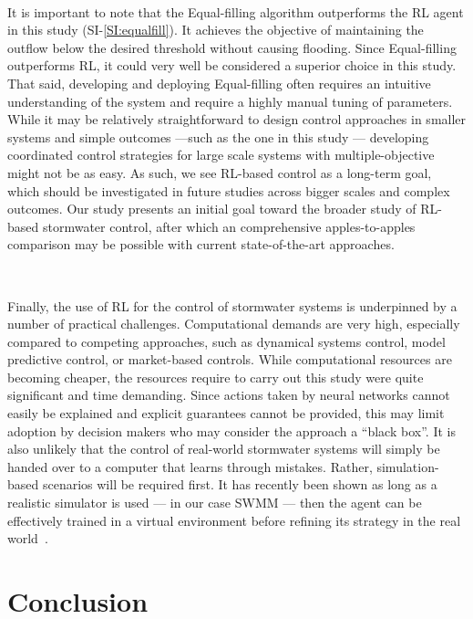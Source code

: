 \

It is important to note that the Equal-filling algorithm outperforms the RL agent in this study (SI-\ref{SI:equalfill}).
It achieves the objective of maintaining the outflow below the desired threshold without causing flooding.
Since Equal-filling outperforms RL, it could very well be considered a superior choice in this study.
That said, developing and deploying Equal-filling often requires an intuitive understanding of the system and require a highly manual tuning of parameters.
While it may be relatively straightforward to design control approaches in smaller systems and simple outcomes ---such as the one in this study --- developing coordinated control strategies for large scale systems with multiple-objective might not be as easy.
As such, we see RL-based control as a long-term goal, which should be investigated in future studies across bigger scales and complex outcomes.
Our study presents an initial goal toward the broader study of RL-based stormwater control, after which an comprehensive apples-to-apples comparison may be possible with current state-of-the-art approaches.

\

Finally, the use of RL for the control of stormwater systems is underpinned by a number of practical challenges.
Computational demands are very high, especially compared to competing approaches, such as dynamical systems control, model predictive control, or market-based controls.
While computational resources are becoming cheaper, the resources require to carry out this study were quite significant and time demanding.
Since actions taken by neural networks cannot easily be explained and explicit guarantees cannot be provided, this may limit adoption by decision makers who may consider the approach a “black box”.
It is also unlikely that the control of real-world stormwater systems will simply be handed over to a computer that learns through mistakes.
Rather, simulation-based scenarios will be required first.
It has recently been shown as long as a realistic simulator is used --- in our case SWMM --- then the agent can be effectively trained in a virtual environment before refining its strategy in the real world~\cite{OpenAI_dota}.

\section{Conclusion}

